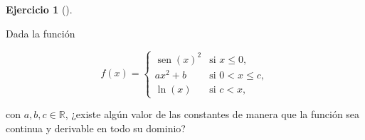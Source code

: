\documentclass[
  a4paper,
]{scrreport}
\theoremstyle{definition}
\newtheorem{exercise}{Ejercicio}[chapter]
\theoremstyle{remark}
\begin{document}
\begin{exercise}[]\protect\hypertarget{exr-derivabilidad-funcion-trozos-3}{}\label{exr-derivabilidad-funcion-trozos-3}

Dada la función

\[
f(x)=
\begin{cases}
\operatorname{sen}(x)^2 & \mbox{si $x\leq 0$},  \\
ax^2+b &  \mbox{si $0<x\leq c$},  \\
\ln(x) &  \mbox{si $c<x$},
\end{cases}
\]

con \(a,b,c\in\mathbb{R}\), ¿existe algún valor de las constantes de
manera que la función sea continua y derivable en todo su dominio?

\end{exercise}
\end{document}
